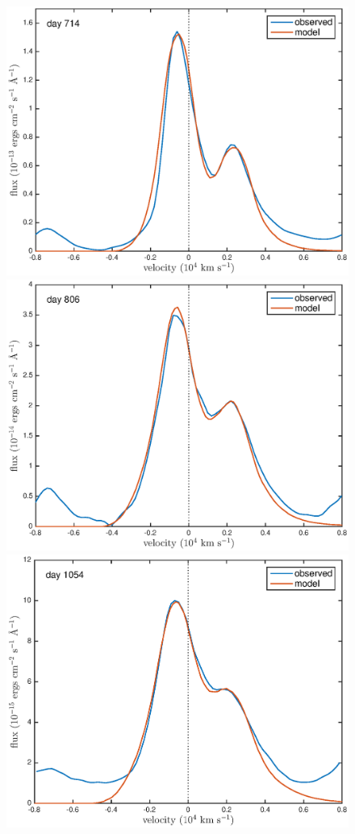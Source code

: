 \documentclass[useAMS,usenatbib,usegraphicx]{mnras}
\begin{document}
\begin{figure}
\begin{center}
\includegraphics[trim =33 10 45 15,clip=true,scale=0.47]{clump_1/best_fit/d714OI_ext}
\includegraphics[trim =33 10 45 15,clip=true,scale=0.47]{clump_1/best_fit/d806OI_ext}
\includegraphics[trim =33 10 45 15,clip=true,scale=0.47]{clump_1/best_fit/d1054OI}

\end{center}
\end{figure}
\end{document}
